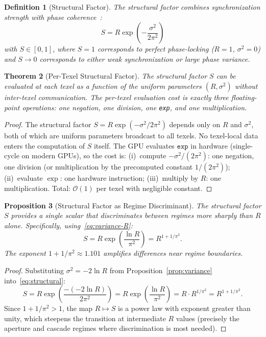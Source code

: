 \documentclass[11pt,twocolumn,a4paper]{article}
\newtheorem{theorem}{Theorem}[section]
\newtheorem{proposition}[theorem]{Proposition}
\newtheorem{definition}[theorem]{Definition}
\newcommand{\BigO}{\mathcal{O}}
\begin{document}
\begin{definition}[Structural Factor]
\label{def:structural}
The structural factor combines synchronization strength with phase coherence~\cite{sachikonye2026regime,sachikonye2026lagrangian}:
\begin{equation}
\boxed{S = R \exp\!\left(-\frac{\sigma^2}{2\pi^2}\right)}
\label{eq:structural}
\end{equation}
with $S \in [0,1]$, where $S = 1$ corresponds to perfect phase-locking ($R = 1$, $\sigma^2 = 0$) and $S \to 0$ corresponds to either weak synchronization or large phase variance.
\end{definition}

\begin{theorem}[Per-Texel Structural Factor]
\label{thm:structural-texel}
The structural factor $S$ can be evaluated at each texel as a function of the uniform parameters $(R, \sigma^2)$ without inter-texel communication.
The per-texel evaluation cost is exactly three floating-point operations: one negation, one division, one \texttt{exp}, and one multiplication.
\end{theorem}

\begin{proof}
The structural factor $S = R \exp(-\sigma^2 / 2\pi^2)$ depends only on $R$ and $\sigma^2$, both of which are uniform parameters broadcast to all texels.
No texel-local data enters the computation of $S$ itself.
The GPU evaluates $\texttt{exp}$ in hardware (single-cycle on modern GPUs), so the cost is:
(i)~compute $-\sigma^2/(2\pi^2)$: one negation, one division (or multiplication by the precomputed constant $1/(2\pi^2)$);
(ii)~evaluate $\exp$: one hardware instruction;
(iii)~multiply by $R$: one multiplication.
Total: $\BigO(1)$ per texel with negligible constant.
\end{proof}

\begin{proposition}[Structural Factor as Regime Discriminant]
\label{prop:s-discriminant}
The structural factor $S$ provides a single scalar that discriminates between regimes more sharply than $R$ alone.
Specifically, using~\eqref{eq:variance-R}:
\begin{equation}
S = R \exp\!\left(\frac{\ln R}{\pi^2}\right) = R^{1 + 1/\pi^2}.
\label{eq:s-from-R}
\end{equation}
The exponent $1 + 1/\pi^2 \approx 1.101$ amplifies differences near regime boundaries.
\end{proposition}

\begin{proof}
Substituting $\sigma^2 = -2\ln R$ from Proposition~\ref{prop:variance} into~\eqref{eq:structural}:
\begin{equation}
S = R \exp\!\left(\frac{-(-2\ln R)}{2\pi^2}\right) = R \exp\!\left(\frac{\ln R}{\pi^2}\right) = R \cdot R^{1/\pi^2} = R^{1+1/\pi^2}.
\end{equation}
Since $1 + 1/\pi^2 > 1$, the map $R \mapsto S$ is a power law with exponent greater than unity, which steepens the transition at intermediate $R$ values (precisely the aperture and cascade regimes where discrimination is most needed).
\end{proof}
\end{document}
